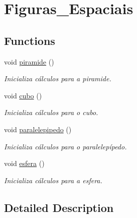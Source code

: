 \hypertarget{group__Figuras__Espaciais}{}\section{Figuras\+\_\+\+Espaciais}
\label{group__Figuras__Espaciais}
\subsection*{Functions}
\begin{DoxyCompactItemize}
\item 
void \hyperlink{group__Figuras__Espaciais_gae3945922f925bc3d1fd95c5dc4ff6987}{piramide} ()\hypertarget{group__Figuras__Espaciais_gae3945922f925bc3d1fd95c5dc4ff6987}{}\label{group__Figuras__Espaciais_gae3945922f925bc3d1fd95c5dc4ff6987}

\begin{DoxyCompactList}\small\item\em Inicializa cálculos para a piramide. \end{DoxyCompactList}\item 
void \hyperlink{group__Figuras__Espaciais_gaf0b7d023166ce6902197d4082a66ad03}{cubo} ()\hypertarget{group__Figuras__Espaciais_gaf0b7d023166ce6902197d4082a66ad03}{}\label{group__Figuras__Espaciais_gaf0b7d023166ce6902197d4082a66ad03}

\begin{DoxyCompactList}\small\item\em Inicializa cálculos para o cubo. \end{DoxyCompactList}\item 
void \hyperlink{group__Figuras__Espaciais_gaf5c3350f35c2d9ae97c0243b7aeac39e}{paralelepipedo} ()\hypertarget{group__Figuras__Espaciais_gaf5c3350f35c2d9ae97c0243b7aeac39e}{}\label{group__Figuras__Espaciais_gaf5c3350f35c2d9ae97c0243b7aeac39e}

\begin{DoxyCompactList}\small\item\em Inicializa cálculos para o paralelepípedo. \end{DoxyCompactList}\item 
void \hyperlink{group__Figuras__Espaciais_ga947bf2f326598c591bbdbf77a0280266}{esfera} ()\hypertarget{group__Figuras__Espaciais_ga947bf2f326598c591bbdbf77a0280266}{}\label{group__Figuras__Espaciais_ga947bf2f326598c591bbdbf77a0280266}

\begin{DoxyCompactList}\small\item\em Inicializa cálculos para a esfera. \end{DoxyCompactList}\end{DoxyCompactItemize}


\subsection{Detailed Description}
